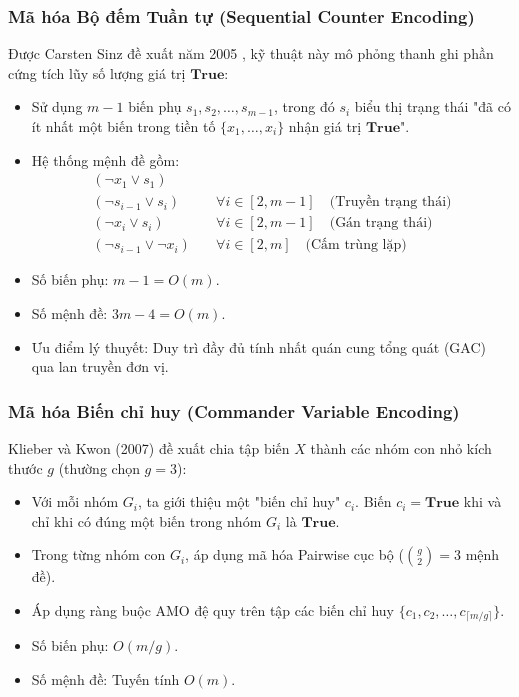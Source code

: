 \documentclass[a4paper,fleqn]{cas-sc}
\begin{document}
\subsubsection{Mã hóa Bộ đếm Tuần tự (Sequential Counter Encoding)}
Được Carsten Sinz đề xuất năm 2005 \cite{sinz2005towards}, kỹ thuật này mô phỏng thanh ghi phần cứng tích lũy số lượng giá trị $\mathbf{True}$:
\begin{itemize}
    \item Sử dụng $m-1$ biến phụ $s_1, s_2, \dots, s_{m-1}$, trong đó $s_i$ biểu thị trạng thái "đã có ít nhất một biến trong tiền tố $\{x_1, \dots, x_i\}$ nhận giá trị $\mathbf{True}$".
    \item Hệ thống mệnh đề gồm:
    \begin{align}
    (\neg x_1 \lor s_1) & \\
    (\neg s_{i-1} \lor s_i) & \quad \forall i \in [2, m-1] \quad \text{(Truyền trạng thái)} \\
    (\neg x_i \lor s_i) & \quad \forall i \in [2, m-1] \quad \text{(Gán trạng thái)} \\
    (\neg s_{i-1} \lor \neg x_i) & \quad \forall i \in [2, m] \quad \text{(Cấm trùng lặp)}
    \end{align}
    \item Số biến phụ: $m - 1 = O(m)$.
    \item Số mệnh đề: $3m - 4 = O(m)$.
    \item Ưu điểm lý thuyết: Duy trì đầy đủ tính nhất quán cung tổng quát (GAC) qua lan truyền đơn vị.
\end{itemize}

\subsubsection{Mã hóa Biến chỉ huy (Commander Variable Encoding)}
Klieber và Kwon (2007) \cite{klieber2007commander} đề xuất chia tập biến $X$ thành các nhóm con nhỏ kích thước $g$ (thường chọn $g=3$):
\begin{itemize}
    \item Với mỗi nhóm $G_i$, ta giới thiệu một "biến chỉ huy" $c_i$. Biến $c_i = \mathbf{True}$ khi và chỉ khi có đúng một biến trong nhóm $G_i$ là $\mathbf{True}$.
    \item Trong từng nhóm con $G_i$, áp dụng mã hóa Pairwise cục bộ ($\binom{g}{2} = 3$ mệnh đề).
    \item Áp dụng ràng buộc AMO đệ quy trên tập các biến chỉ huy $\{c_1, c_2, \dots, c_{\lceil m/g \rceil}\}$.
    \item Số biến phụ: $O(m/g)$.
    \item Số mệnh đề: Tuyến tính $O(m)$.
\end{itemize}
\end{document}
